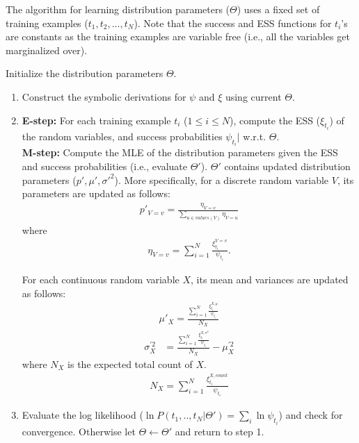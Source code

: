 The algorithm for learning distribution parameters ($\Theta$) uses a fixed set of training examples ($t_{1}, t_{2}, ..., t_{N}$). Note that the success and ESS functions for $t_{i}$'s are constants as the training examples are variable free (i.e., all the variables get marginalized over). 

\begin{Algo}
\label{EMalgo}
Initialize the distribution parameters $\Theta$.
\begin{enumerate}
\item 
Construct the symbolic derivations for $\psi$ and $\xi$ using current $\Theta$.
\item
\textbf{E-step:} For each training example $t_{i}$ ($1\leq i \leq N$),
compute the ESS ($\xi_{t_{i}}$) of the random variables, and success
probabilities $\psi_{t_{i}}|$ w.r.t. $\Theta$. \\
\textbf{M-step:} Compute the MLE of the distribution parameters given the ESS and success probabilities (i.e., evaluate $\Theta'$).
$\Theta'$ contains updated distribution parameters ($p', \mu', \sigma'^{2}$).
More specifically, for a discrete random variable $V$, its parameters are updated as follows:
\begin{align*}
p'_{V= v}  =  \frac {\eta_{V=v}} {\sum_{u \in values(V)} \eta_{V=u}}
\end{align*}
where 
\begin{align*}
\eta_{V=v} = \sum_{i=1}^{N} \frac{\xi^{V=v}_{t_{i}}} {\psi_{t_{i}}}.
\end{align*}

For each continuous random variable $X$, its mean and variances are updated as follows: 
\begin{align*}
\mu'_{X}  =  \frac {\sum_{i=1}^{N} \frac{\xi^{X,\mu}_{t_{i}}} {\psi_{t_{i}}}} {N_{X}} 
\end{align*}
\begin{align*}
\sigma_{X}^{'2} &=  \frac {\sum_{i=1}^{N} \frac{\xi^{X,\sigma^{2}}_{t_{i}}  } {\psi_{t_{i}}}} {N_{X}} -  \mu_{X}^{'2} 
\end{align*}
where $N_{X}$ is the expected total count of $X$.
\begin{align*}
N_{X}  =  \sum_{i=1}^{N} \frac{\xi^{X,count}_{t_{i}}} {\psi_{t_{i}}}
\end{align*}
\item
Evaluate the log likelihood ($\ln P(t_{1},..,t_{N}|\Theta') = \sum_{i}
\ln \psi_{t_i}$) and check for convergence. Otherwise let $\Theta \leftarrow \Theta'$ and return to step 1. 
\end{enumerate}
\end{Algo}


